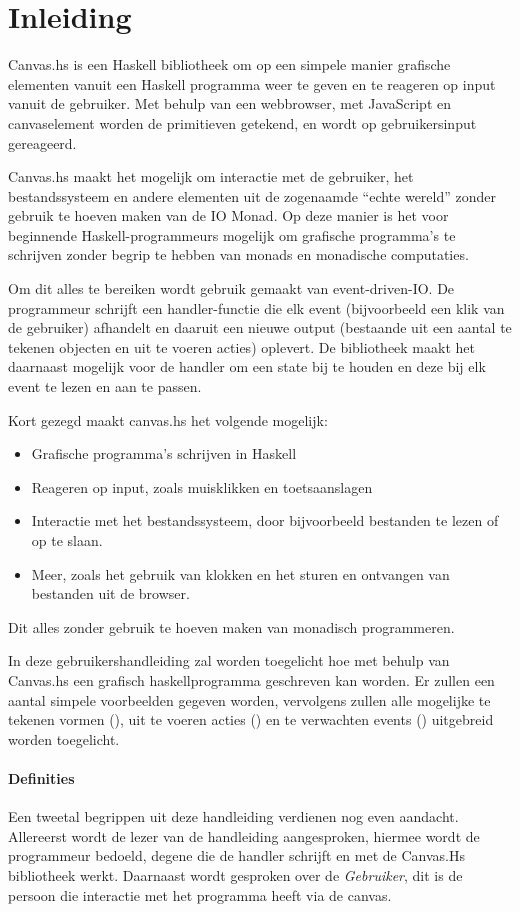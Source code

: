 \section{Inleiding}

Canvas.hs is een Haskell bibliotheek om op een simpele manier grafische elementen vanuit een Haskell programma weer te geven en te reageren op input vanuit de gebruiker. Met behulp van een webbrowser, met JavaScript en canvaselement worden de primitieven getekend, en wordt op gebruikersinput gereageerd.

Canvas.hs maakt het mogelijk om interactie met de gebruiker, het bestandssysteem en andere elementen uit de zogenaamde ``echte wereld'' zonder gebruik te hoeven maken van de IO Monad. Op deze manier is het voor beginnende Haskell-programmeurs mogelijk om grafische programma's te schrijven zonder begrip te hebben van monads en monadische computaties.

Om dit alles te bereiken wordt gebruik gemaakt van event-driven-IO. De programmeur schrijft een handler-functie die elk event (bijvoorbeeld een klik van de gebruiker) afhandelt en daaruit een nieuwe output (bestaande uit een aantal te tekenen objecten en uit te voeren acties) oplevert. De bibliotheek maakt het daarnaast mogelijk voor de handler om een state bij te houden en deze bij elk event te lezen en aan te passen. 

Kort gezegd maakt canvas.hs het volgende mogelijk:
\begin{itemize}
	\item Grafische programma's schrijven in Haskell
	\item Reageren op input, zoals muisklikken en toetsaanslagen
	\item Interactie met het bestandssysteem, door bijvoorbeeld bestanden te lezen of op te slaan.
	\item Meer, zoals het gebruik van klokken en het sturen en ontvangen van bestanden uit de browser.
\end{itemize}
Dit alles zonder gebruik te hoeven maken van monadisch programmeren. 

In deze gebruikershandleiding zal worden toegelicht hoe met behulp van Canvas.hs een grafisch haskellprogramma geschreven kan worden. Er zullen een aantal simpele voorbeelden gegeven worden, vervolgens zullen alle mogelijke te tekenen vormen (\shapes), uit te voeren acties (\actions) en te verwachten events (\events) uitgebreid worden toegelicht. 

\paragraph{Definities} 
Een tweetal begrippen uit deze handleiding verdienen nog even aandacht. Allereerst wordt de lezer van de handleiding aangesproken, hiermee wordt de programmeur bedoeld, degene die de handler schrijft en met de Canvas.Hs bibliotheek werkt. Daarnaast wordt gesproken over de \emph{Gebruiker}, dit is de persoon die interactie met het programma heeft via de canvas.